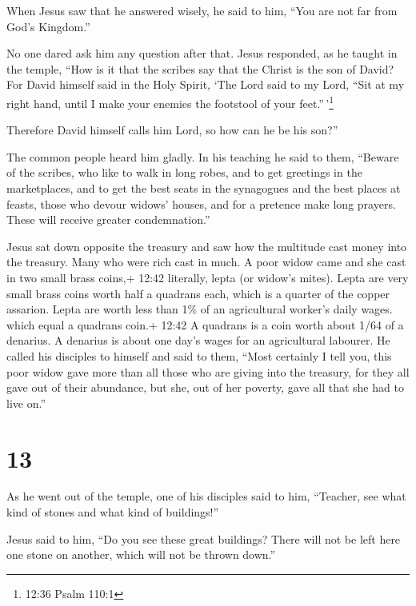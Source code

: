  When Jesus saw that he answered wisely, he said to him,
``You are not far from God's Kingdom.''

No one dared ask him any question after that.  Jesus
responded, as he taught in the temple, ``How is it that the scribes say
that the Christ is the son of David?  For David himself
said in the Holy Spirit, `The Lord said to my Lord, ``Sit at my right
hand, until I make your enemies the footstool of your
feet.''\,'\footnote{12:36 Psalm 110:1}

 Therefore David himself calls him Lord, so how can he be
his son?''

The common people heard him gladly.  In his teaching he
said to them, ``Beware of the scribes, who like to walk in long robes,
and to get greetings in the marketplaces,  and to get the
best seats in the synagogues and the best places at feasts,
 those who devour widows' houses, and for a pretence make
long prayers. These will receive greater condemnation.''

 Jesus sat down opposite the treasury and saw how the
multitude cast money into the treasury. Many who were rich cast in much.
 A poor widow came and she cast in two small brass coins,+
12:42 literally, lepta (or widow's mites). Lepta are very small brass
coins worth half a quadrans each, which is a quarter of the copper
assarion. Lepta are worth less than 1\% of an agricultural worker's
daily wages. which equal a quadrans coin.+ 12:42 A quadrans is a coin
worth about 1/64 of a denarius. A denarius is about one day's wages for
an agricultural labourer.  He called his disciples to
himself and said to them, ``Most certainly I tell you, this poor widow
gave more than all those who are giving into the treasury, 
for they all gave out of their abundance, but she, out of her poverty,
gave all that she had to live on.''

\hypertarget{section-12}{%
\section{13}\label{section-12}}

 As he went out of the temple, one of his disciples said to
him, ``Teacher, see what kind of stones and what kind of buildings!''

 Jesus said to him, ``Do you see these great buildings?
There will not be left here one stone on another, which will not be
thrown down.''

